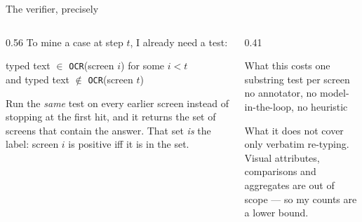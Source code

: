 \documentclass[aspectratio=169,10pt]{beamer}
\newcommand{\gr}[1]{{\color{ncgray}#1}}
\begin{document}
\begin{frame}{The verifier, precisely}
\vspace{0.3cm}
\begin{columns}[T]
\begin{column}{0.56\textwidth}
To \alert{mine} a case at step $t$, I already need a test:
\vspace{0.4em}
\begin{block}{}
\centering typed text $\in$ \texttt{OCR}(screen $i$) \quad for some $i<t$\\[0.25em]
and \quad typed text $\notin$ \texttt{OCR}(screen $t$)
\end{block}
\vspace{0.6em}
Run the \emph{same} test on \alert{every} earlier screen instead of stopping at the first hit, and it returns the set of screens that contain the answer.
\vspace{0.6em}
That set \emph{is} the label: screen $i$ is positive iff it is in the set.
\end{column}
\begin{column}{0.41\textwidth}
\begin{block}{What this costs}
one substring test per screen\\[0.3em]
\gr{no annotator, no model-in-the-loop, no heuristic}
\end{block}
\vspace{0.4em}
\begin{block}{What it does not cover}
only verbatim re-typing.\\[0.3em]
\gr{Visual attributes, comparisons and aggregates are out of scope --- so my counts are a lower bound.}
\end{block}
\end{column}
\end{columns}
\end{frame}
\end{document}
